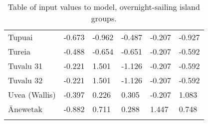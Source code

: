 \begin{longtable}{p{4.5cm}p{2cm}p{2cm}p{2cm}p{2cm}p{2cm}}
  Tupuai & -0.673 & -0.962 & -0.487 & -0.207 & -0.927 \\ 
  Tureia & -0.488 & -0.654 & -0.651 & -0.207 & -0.592 \\ 
  Tuvalu 31 & -0.221 & 1.501 & -1.126 & -0.207 & -0.592 \\ 
  Tuvalu 32 & -0.221 & 1.501 & -1.126 & -0.207 & -0.592 \\ 
  Uvea (Wallis) & -0.397 & 0.226 & 0.305 & -0.207 & 1.083 \\ 
  Ānewetak & -0.882 & 0.711 & 0.288 & 1.447 & 0.748 \\ 
   \bottomrule
\caption{Table of input values to model, overnight-sailing island groups.} 
\label{appendix_SBZR_table}
\end{longtable}
